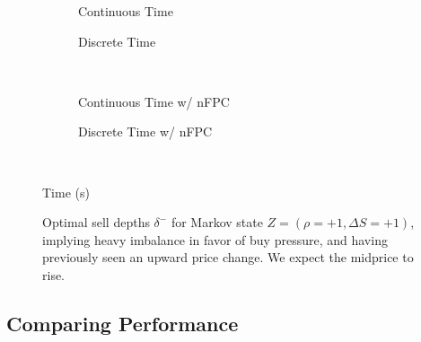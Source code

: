 \begin{figure}
\centering
\begin{subfigure}{.45\linewidth}
  \centering
  \setlength\figureheight{\linewidth} 
  \setlength\figurewidth{\linewidth}
  
  \caption{Continuous Time}
\end{subfigure}%
\hfill%
\begin{subfigure}{.45\linewidth}
  \centering
  \setlength\figureheight{\linewidth} 
  \setlength\figurewidth{\linewidth}
   
  \caption{Discrete Time}
\end{subfigure}\\
\vspace{1cm}
\begin{subfigure}{.45\linewidth}
  \centering
  \setlength\figureheight{\linewidth} 
  \setlength\figurewidth{\linewidth}
   
  \caption{Continuous Time w/ nFPC}
\end{subfigure}%
\hfill%
\begin{subfigure}{.45\linewidth}
  \centering
  \setlength\figureheight{\linewidth} 
  \setlength\figurewidth{\linewidth}
   
  \caption{Discrete Time w/ nFPC}
\end{subfigure}\\

\leavevmode{}\hspace{0pt plus 1filll}\null

Time (s)

\vspace{1cm}
\begin{subfigure}{\linewidth}
  \centering
   
\end{subfigure}%
  \caption{Optimal sell depths $\delta^{-}$ for Markov state $Z=(\rho = +1, \Delta S = +1)$, implying heavy imbalance in favor of buy pressure, and having previously seen an upward price change. We expect the midprice to rise.}
  \label{fig:comp_dm_z15}
\end{figure}

\FloatBarrier
\subsection{Comparing Performance}

